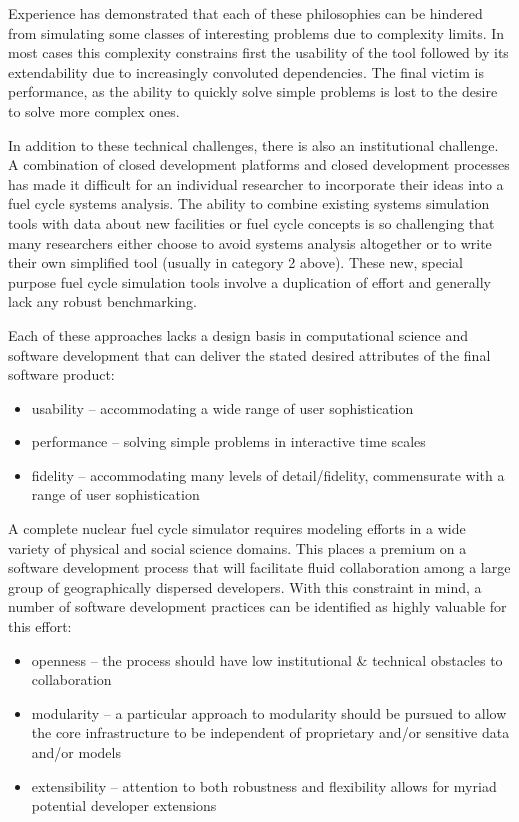 \documentclass[letterpaper,10pt,english]{sphinxmanual}
\begin{document}
Experience has demonstrated that each of these philosophies can be hindered from
simulating some classes of interesting problems due to complexity limits.  In most cases this
complexity constrains first the usability of the tool followed by its
extendability due to increasingly convoluted dependencies. The final victim is
performance, as the ability to quickly solve simple problems is lost to the
desire to solve more complex ones.

In addition to these technical challenges, there is also an institutional
challenge.  A combination of closed development platforms and closed
development processes has made it difficult for an individual researcher to
incorporate their ideas into a fuel cycle systems analysis.  The ability to
combine existing systems simulation tools with data about new facilities or
fuel cycle concepts is so challenging that many researchers either choose to
avoid systems analysis altogether or to write their own simplified tool
(usually in category 2 above).  These new, special purpose fuel cycle
simulation tools involve a duplication of effort and generally lack any robust
benchmarking.

Each of these approaches lacks a design basis in computational science and
software development that can deliver the stated desired attributes of the
final software product:
\begin{itemize}
\item {} 
usability -- accommodating a wide range of user sophistication

\item {} 
performance -- solving simple problems in interactive time scales

\item {} 
fidelity -- accommodating many levels of detail/fidelity, commensurate with a range of user sophistication

\end{itemize}

A complete nuclear fuel cycle simulator requires modeling efforts in a wide
variety of physical and social science domains.  This places a premium on a
software development process that will facilitate fluid collaboration among a
large group of geographically dispersed developers.  With this constraint in
mind, a number of software development practices can be identified as highly
valuable for this effort:
\begin{itemize}
\item {} 
openness -- the process should have low institutional \& technical obstacles to collaboration

\item {} 
modularity -- a particular approach to modularity should be pursued to allow the core infrastructure to be independent of proprietary and/or sensitive data and/or models

\item {} 
extensibility -- attention to both robustness and flexibility allows for myriad potential developer extensions

\end{itemize}
\end{document}
